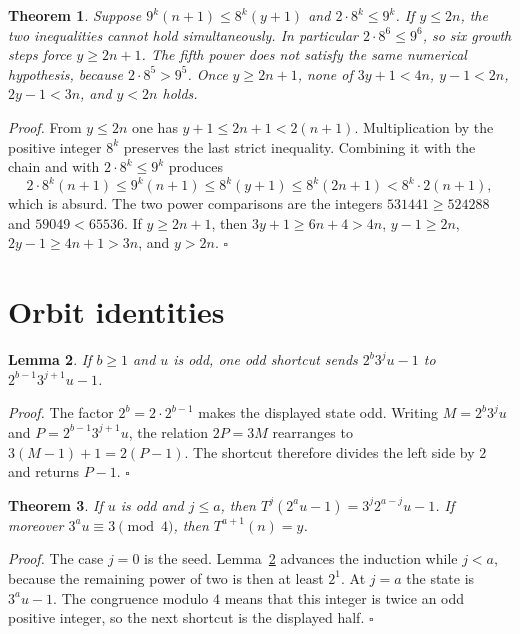 \documentclass[11pt,letterpaper]{article}
\newtheorem{theorem}{Theorem}
\newtheorem{lemma}[theorem]{Lemma}
\newenvironment{proof}{\noindent\textit{Proof.}}{\hfill\(\square\)}
\begin{document}
\begin{theorem}
\label{thm:six}
Suppose \(9^k(n+1)\le 8^k(y+1)\) and \(2\cdot 8^k\le 9^k\). If \(y\le 2n\), the two inequalities cannot hold simultaneously. In particular \(2\cdot 8^6\le 9^6\), so six growth steps force \(y\ge 2n+1\). The fifth power does not satisfy the same numerical hypothesis, because \(2\cdot 8^5>9^5\). Once \(y\ge 2n+1\), none of \(3y+1<4n\), \(y-1<2n\), \(2y-1<3n\), and \(y<2n\) holds.
\end{theorem}

\begin{proof}
From \(y\le 2n\) one has \(y+1\le 2n+1<2(n+1)\). Multiplication by the positive integer \(8^k\) preserves the last strict inequality. Combining it with the chain and with \(2\cdot 8^k\le 9^k\) produces
\[
2\cdot 8^k(n+1)\le 9^k(n+1)\le 8^k(y+1)\le 8^k(2n+1)<8^k\cdot 2(n+1),
\]
which is absurd. The two power comparisons are the integers \(531441\ge 524288\) and \(59049<65536\). If \(y\ge 2n+1\), then \(3y+1\ge 6n+4>4n\), \(y-1\ge 2n\), \(2y-1\ge 4n+1>3n\), and \(y>2n\).
\end{proof}

\section{Orbit identities}

\begin{lemma}
\label{lem:step}
If \(b\ge 1\) and \(u\) is odd, one odd shortcut sends \(2^b 3^j u-1\) to \(2^{b-1}3^{j+1}u-1\).
\end{lemma}

\begin{proof}
The factor \(2^b=2\cdot 2^{b-1}\) makes the displayed state odd. Writing \(M=2^b 3^j u\) and \(P=2^{b-1}3^{j+1}u\), the relation \(2P=3M\) rearranges to \(3(M-1)+1=2(P-1)\). The shortcut therefore divides the left side by \(2\) and returns \(P-1\).
\end{proof}

\begin{theorem}
\label{thm:run}
If \(u\) is odd and \(j\le a\), then \(T^j(2^a u-1)=3^j 2^{a-j}u-1\). If moreover \(3^a u\equiv 3\pmod{4}\), then \(T^{a+1}(n)=y\).
\end{theorem}

\begin{proof}
The case \(j=0\) is the seed. Lemma~\ref{lem:step} advances the induction while \(j<a\), because the remaining power of two is then at least \(2^1\). At \(j=a\) the state is \(3^a u-1\). The congruence modulo \(4\) means that this integer is twice an odd positive integer, so the next shortcut is the displayed half.
\end{proof}
\end{document}
